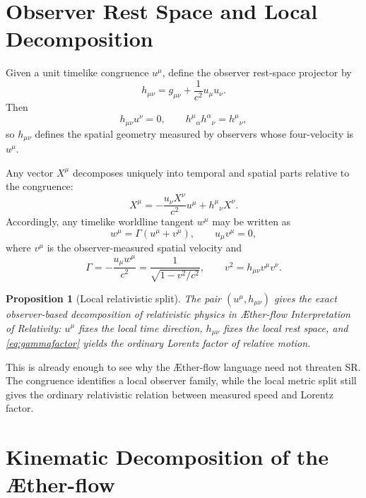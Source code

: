 \documentclass[11pt]{article}
\newcommand{\Aflow}{\AE{}ther-flow}
\newcommand{\TheoryName}{\Aflow{} Interpretation of Relativity}
\newtheorem{proposition}{Proposition}
\begin{document}
\section{Observer Rest Space and Local Decomposition}

Given a unit timelike congruence \(u^\mu\), define the observer rest-space projector by
\begin{equation}
h_{\mu\nu}
=
g_{\mu\nu}+\frac{1}{c^2}u_\mu u_\nu.
\label{eq:projector}
\end{equation}
Then
\begin{equation}
h_{\mu\nu}u^\nu = 0,
\qquad
h^\mu{}_{\alpha}h^\alpha{}_{\nu}=h^\mu{}_{\nu},
\label{eq:projectorprops}
\end{equation}
so \(h_{\mu\nu}\) defines the spatial geometry measured by observers whose four-velocity is \(u^\mu\).

Any vector \(X^\mu\) decomposes uniquely into temporal and spatial parts relative to the congruence:
\begin{equation}
X^\mu
=
-\frac{u_\nu X^\nu}{c^2}u^\mu
+
h^\mu{}_{\nu}X^\nu.
\label{eq:vectordecomp}
\end{equation}
Accordingly, any timelike worldline tangent \(w^\mu\) may be written as
\begin{equation}
w^\mu
=
\Gamma\left(u^\mu+v^\mu\right),
\qquad
u_\mu v^\mu=0,
\label{eq:reldecomp}
\end{equation}
where \(v^\mu\) is the observer-measured spatial velocity and
\begin{equation}
\Gamma
=
-\frac{u_\mu w^\mu}{c^2}
=
\frac{1}{\sqrt{1-v^2/c^2}},
\qquad
v^2=h_{\mu\nu}v^\mu v^\nu.
\label{eq:gammafactor}
\end{equation}

\begin{proposition}[Local relativistic split]
The pair \((u^\mu,h_{\mu\nu})\) gives the exact observer-based decomposition of relativistic physics in \TheoryName{}: \(u^\mu\) fixes the local time direction, \(h_{\mu\nu}\) fixes the local rest space, and \eqref{eq:gammafactor} yields the ordinary Lorentz factor of relative motion.
\end{proposition}

This is already enough to see why the \Aflow{} language need not threaten SR. The congruence identifies a local observer family, while the local metric split still gives the ordinary relativistic relation between measured speed and Lorentz factor.

\section{Kinematic Decomposition of the \Aflow{}}
\end{document}
